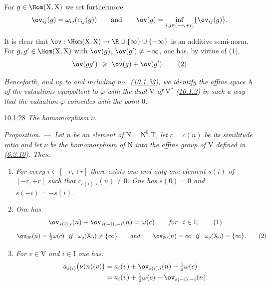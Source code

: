 \documentclass[12pt,a4paper,oneside,english]{smfart}
\makeatletter
\newcommand{\btanchor}[1]{\leavevmode\Hy@raisedlink{\hypertarget{bt:#1}{}}}
\newcommand{\btref}[1]{\hyperlink{bt:#1}{#1}}
\newcommand{\btunnum}[1]{\par\medskip\noindent\emph{#1}.\ ---\ \ignorespaces}
\theoremstyle{definition}
\theoremstyle{bt}
\makeatother
\begin{document}
For $g\in\Hom(\mathrm{X},\mathrm{X})$ we set furthermore
\[
\ov_{ij}(g)=\omega_{ij}(c_{ij}(g))
\qquad\text{and}\qquad
\ov(g)=\inf_{i,j\in[-r,+r]}\{\ov_{ij}(g)\}.
\]

It is clear that
$\ov:\Hom(\mathrm{X},\mathrm{X})\to\R\cup\{\infty\}\cup\{-\infty\}$ is an
additive semi-norm. For $g,g'\in\Hom(\mathrm{X},\mathrm{X})$ with $\ov(g)$,
$\ov(g')\neq-\infty$, one has, by virtue of (1),
\begin{equation*}
\ov(gg')\ \geqslant\ \ov(g)+\ov(g').
\tag{2}
\end{equation*}

\medskip
\noindent
\emph{Henceforth, and up to and including no.~(\btref{10.1.33}), we identify the affine
space $\mathrm{A}$ of the valuations equipollent to $\varphi$ with the dual
$\mathrm{V}$ of $\mathrm{V}^{*}$ (\btref{10.1.2}) in such a way that the valuation
$\varphi$ coincides with the point $0$.}

\num{10.1.28}\btanchor{10.1.28} \emph{The homomorphism $\nu$.}

\btunnum{Proposition}\emph{Let $n$ be an element of
$\mathrm{N}=\mathrm{N}^{0}.\mathrm{T}$, let $c=c(n)$ be its similitude ratio and
let $\nu$ be the homomorphism of $\mathrm{N}$ into the affine group of
$\mathrm{V}$ defined in (\btref{6.2.10}). Then:}

\begin{enumerate}[label=(\roman*),leftmargin=2.5em]
\item \emph{For every $i\in[-r,+r]$ there exists one and only one element $s(i)$
of $[-r,+r]$ such that $c_{s(i),i}(n)\neq 0$. One has $s(0)=0$ and
$s(-i)=-s(i)$.}
\item \emph{One has}
\begin{equation*}
\ov_{s(i),i}(n)+\ov_{s(-i),-i}(n)=\omega(c)\qquad\text{\emph{for } } i\in\mathrm{I};
\tag{1}
\end{equation*}
\begin{equation*}
\ov_{00}(n)=\tfrac{1}{2}\omega(c)\ \text{ \emph{if} }\ \omega_q(\mathrm{X}_0)\neq\{\infty\}
\qquad\text{\emph{and}}\qquad
\ov_{00}(n)=\infty\ \text{ \emph{if} }\ \omega_q(\mathrm{X}_0)=\{\infty\}.
\tag{2}
\end{equation*}
\item \emph{For $v\in\mathrm{V}$ and $i\in\mathrm{I}$ one has:}
\begin{align*}
a_{s(i)}\bigl(\nu(n)(v)\bigr)
&= a_i(v)+\ov_{s(i),i}(n)-\tfrac{1}{2}\omega(c)\\
&= a_i(v)+\tfrac{1}{2}\omega(c)-\ov_{s(-i),-i}(n).
\end{align*}
\end{enumerate}
\end{document}
